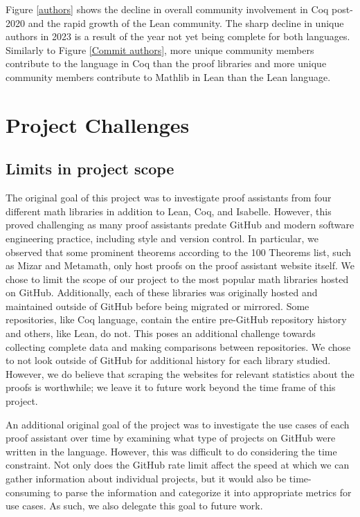 \documentclass[sigconf,nonacm]{acmart}
\begin{document}
Figure \ref{authors} shows the decline in overall community involvement in Coq post-2020 and the rapid growth of the Lean community. The sharp decline in unique authors in 2023 is a result of the year not yet being complete for both languages. Similarly to Figure \ref{Commit authors}, more unique community members contribute to the language in Coq than the proof libraries and more unique community members contribute to Mathlib in Lean than the Lean language.

\section{Project Challenges}

\subsection{Limits in project scope}

The original goal of this project was to investigate proof assistants from four different math libraries in addition to Lean, Coq, and Isabelle. However, this proved challenging as many proof assistants predate GitHub and modern software engineering practice, including style and version control. In particular, we observed that some prominent theorems according to the 100 Theorems list, such as Mizar and Metamath, only host proofs on the proof assistant website itself. We chose to limit the scope of our project to the most popular math libraries hosted on GitHub. Additionally, each of these libraries was originally hosted and maintained outside of GitHub before being migrated or mirrored. Some repositories, like Coq language, contain the entire pre-GitHub repository history and others, like Lean, do not. This poses an additional challenge towards collecting complete data and making comparisons between repositories. We chose to not look outside of GitHub for additional history for each library studied. However, we do believe that scraping the websites for relevant statistics about the proofs is worthwhile; we leave it to future work beyond the time frame of this project.

An additional original goal of the project was to investigate the use cases of each proof assistant over time by examining what type of projects on GitHub were written in the language. However, this was difficult to do considering the time constraint. Not only does the GitHub rate limit affect the speed at which we can gather information about individual projects, but it would also be time-consuming to parse the information and categorize it into appropriate metrics for use cases. As such, we also delegate this goal to future work.
\end{document}
